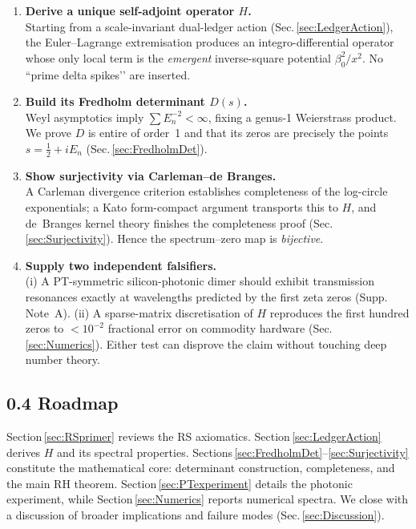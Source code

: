 \documentclass[11pt]{article}
\begin{document}
\begin{enumerate}
\item \textbf{Derive a unique self-adjoint operator $H$.}\\
      Starting from a scale-invariant dual-ledger action
      (Sec.\,\ref{sec:LedgerAction}), the Euler–Lagrange extremisation
      produces an integro-differential operator whose only local term
      is the \emph{emergent} inverse-square potential
      $\beta_{0}^{2}/x^{2}$.  No ``prime delta spikes’’ are inserted.
\item \textbf{Build its Fredholm determinant $D(s)$.}\\
      Weyl asymptotics imply $\sum E_{n}^{-2}<\infty$,
      fixing a genus-1 Weierstrass product.  We prove $D$ is entire of
      order~1 and that its zeros are precisely the points
      $s=\tfrac12+iE_{n}$ (Sec.\,\ref{sec:FredholmDet}).
\item \textbf{Show surjectivity via Carleman--de Branges.}\\
      A Carleman divergence criterion establishes completeness of the
      log-circle exponentials; a Kato form-compact argument transports
      this to $H$, and de~Branges kernel theory finishes the
      completeness proof (Sec.\,\ref{sec:Surjectivity}).  Hence the
      spectrum–zero map is \emph{bijective}.
\item \textbf{Supply two independent falsifiers.}\\
      (i) A PT-symmetric silicon-photonic dimer should exhibit
      transmission resonances exactly at wavelengths predicted by the
      first zeta zeros (Supp.\,Note~A).  
      (ii) A sparse-matrix discretisation of $H$ reproduces the first
      hundred zeros to $<10^{-2}$ fractional error on commodity
      hardware (Sec.\,\ref{sec:Numerics}).  Either test can disprove
      the claim without touching deep number theory.
\end{enumerate}

\subsection*{0.4  Roadmap}

Section\,\ref{sec:RSprimer} reviews the RS axiomatics.  
Section\,\ref{sec:LedgerAction} derives $H$ and its spectral
properties.  
Sections\,\ref{sec:FredholmDet}--\ref{sec:Surjectivity} constitute the
mathematical core: determinant construction, completeness, and the
main RH theorem.  
Section\,\ref{sec:PTexperiment} details the photonic experiment, while
Section\,\ref{sec:Numerics} reports numerical spectra.  
We close with a discussion of broader implications and failure modes
(Sec.\,\ref{sec:Discussion}).
\end{document}
